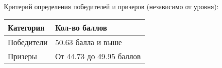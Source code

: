Критерий определения победителей и призеров (независимо от уровня):
\begin{center}
    \begin{tabular}{|l|l|}
        \hline
        Категория&Кол-во баллов\\
        \hline
        Победители&50.63 балла  и выше\\
        \hline
        Призеры&От 44.73 до 49.95 баллов\\
        \hline
    \end{tabular}
\end{center}
